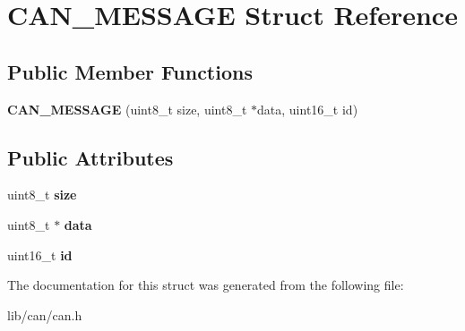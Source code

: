 \hypertarget{struct_c_a_n___m_e_s_s_a_g_e}{\section{C\-A\-N\-\_\-\-M\-E\-S\-S\-A\-G\-E Struct Reference}
\label{struct_c_a_n___m_e_s_s_a_g_e}
}
\subsection*{Public Member Functions}
\begin{DoxyCompactItemize}
\item 
\hypertarget{struct_c_a_n___m_e_s_s_a_g_e_a4d2691218929369d2fa4344dadefbd05}{{\bfseries C\-A\-N\-\_\-\-M\-E\-S\-S\-A\-G\-E} (uint8\-\_\-t size, uint8\-\_\-t $\ast$data, uint16\-\_\-t id)}\label{struct_c_a_n___m_e_s_s_a_g_e_a4d2691218929369d2fa4344dadefbd05}

\end{DoxyCompactItemize}
\subsection*{Public Attributes}
\begin{DoxyCompactItemize}
\item 
\hypertarget{struct_c_a_n___m_e_s_s_a_g_e_a903564a9fb7ec037b361b3a069f64c4a}{uint8\-\_\-t {\bfseries size}}\label{struct_c_a_n___m_e_s_s_a_g_e_a903564a9fb7ec037b361b3a069f64c4a}

\item 
\hypertarget{struct_c_a_n___m_e_s_s_a_g_e_af47a24bd0607a2569a751ecdc46dfc7b}{uint8\-\_\-t $\ast$ {\bfseries data}}\label{struct_c_a_n___m_e_s_s_a_g_e_af47a24bd0607a2569a751ecdc46dfc7b}

\item 
\hypertarget{struct_c_a_n___m_e_s_s_a_g_e_a097105b66c8450f06aa08371cf4fcef3}{uint16\-\_\-t {\bfseries id}}\label{struct_c_a_n___m_e_s_s_a_g_e_a097105b66c8450f06aa08371cf4fcef3}

\end{DoxyCompactItemize}


The documentation for this struct was generated from the following file\-:\begin{DoxyCompactItemize}
\item 
lib/can/can.\-h\end{DoxyCompactItemize}
